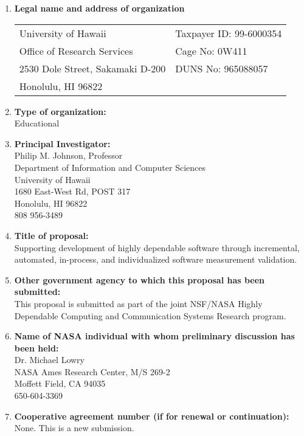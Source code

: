 \begin{enumerate}
\item {\bf Legal name and address of organization} \\
\begin{tabular}{ll}
University of Hawaii         & Taxpayer ID: 99-6000354 \\
Office of Research Services  & Cage No: 0W411\\
2530 Dole Street, Sakamaki D-200 & DUNS No: 965088057 \\
Honolulu, HI 96822 & \\
\end{tabular}

\item {\bf Type of organization:} \\
Educational

\item {\bf Principal Investigator:} \\
Philip M. Johnson, Professor \\
Department of Information and Computer Sciences \\
University of Hawaii \\
1680 East-West Rd, POST 317 \\
Honolulu, HI 96822 \\
808 956-3489

\item {\bf Title of proposal: } \\
Supporting development of highly dependable software through incremental,
automated, in-process, and individualized software measurement validation.

\item {\bf Other government agency to which this proposal has been submitted: } \\
This proposal is submitted as part of the joint NSF/NASA Highly Dependable
Computing and Communication Systems Research program.

\item {\bf Name of NASA individual with whom preliminary discussion has
been held: } \\
Dr. Michael Lowry \\
NASA Ames Research Center, M/S 269-2 \\
Moffett Field, CA 94035 \\
650-604-3369

\item {\bf Cooperative agreement number (if for renewal or continuation):}
\\
None. This is a new submission.


\end{enumerate}
